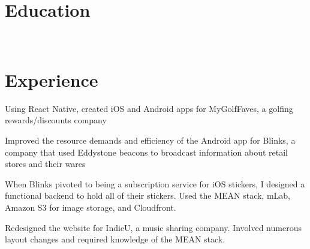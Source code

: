 \documentclass[]{deedy-resume-openfont}
\begin{document}
%
%
%
%
\section{Education}
\raggedright

\hfill {}\\

\sectionsep
%
%
\section{Experience}
\hfill {}
\begin{tightemize}
  \item Using React Native, created iOS and Android apps for MyGolfFaves, a golfing rewards/discounts company
\end{tightemize}
\sectionsep
{}\hfill {}
\begin{tightemize}
  \item Improved the resource demands and efficiency of the Android app for Blinks, a company that used Eddystone beacons to broadcast information about retail stores and their wares
  \item When Blinks pivoted to being a subscription service for iOS stickers, I designed a functional backend to hold all of their stickers. Used the MEAN stack, mLab, Amazon S3 for image storage, and Cloudfront.
\end{tightemize}
\sectionsep
{}\hfill {}
\begin{tightemize}
  \item Redesigned the website for IndieU, a music sharing company. Involved numerous layout changes and required knowledge of the MEAN stack.
\end{tightemize}
\sectionsep
%
%
\end{document}
